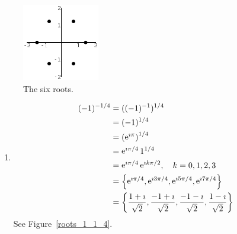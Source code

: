 {\begin{Solution}
\begin{enumerate}
    \begin{figure}[h!]
      \begin{center}
        \includegraphics[width=0.3\textwidth]{fcv/number/roots_8_1_6}
      \end{center}
      \caption{The six roots.}
      \label{roots_8_1_6}
    \end{figure}

  \end{enumerate}
\end{Solution}












\begin{Solution}
  \label{solution 16 1/8}
  \begin{enumerate}
  \item
    \begin{align*}
      (-1)^{-1/4}
      &= ((-1)^{-1})^{1/4} 
      \\
      &= (-1)^{1/4} 
      \\
      &= \left( \mathop{\mathrm{e}}\nolimits^{\imath \pi} \right)^{1/4} 
      \\
      &= \mathop{\mathrm{e}}\nolimits^{\imath \pi / 4} 1^{1/4} 
      \\
      &= \mathop{\mathrm{e}}\nolimits^{\imath \pi / 4} \mathop{\mathrm{e}}\nolimits^{\imath k \pi / 2}, \quad k = 0, 1, 2, 3 
      \\
      &= \left\{ \mathop{\mathrm{e}}\nolimits^{\imath \pi / 4}, \mathop{\mathrm{e}}\nolimits^{\imath 3 \pi / 4}, \mathop{\mathrm{e}}\nolimits^{\imath 5 \pi / 4}, \mathop{\mathrm{e}}\nolimits^{\imath 7 \pi / 4} \right\} 
      \\
      &= \left\{ \frac{1 + \imath}{\sqrt{2}}, \frac{-1 + \imath}{\sqrt{2}},
        \frac{-1 - \imath}{\sqrt{2}}, \frac{1 - \imath}{\sqrt{2}} \right\}
    \end{align*}
    See Figure~\ref{roots_1_1_4}.


\end{enumerate}
\end{Solution}}

